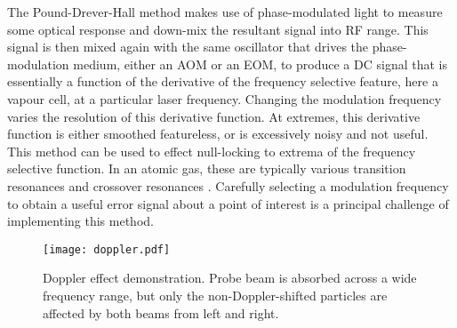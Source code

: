 The Pound-Drever-Hall method makes use of phase-modulated light to measure some
optical response and down-mix the resultant signal into RF range. This signal
is then mixed again with the same oscillator that drives the phase-modulation medium,
either an AOM or an EOM, to produce a DC signal that is essentially a function of
the derivative of the frequency selective feature, here a vapour cell, at a particular
laser frequency. Changing the modulation frequency varies the resolution of this
derivative function. At extremes, this derivative function is either smoothed featureless,
or is excessively noisy and not useful. \\

This method can be used to effect null-locking to extrema of the frequency selective
function. In an atomic gas, these are typically various transition resonances and
crossover resonances \cite{maguire2006}. Carefully selecting a modulation frequency
to obtain a useful error signal about a point of interest is a principal challenge of
implementing this method.

\begin{figure}[!hrt]
    \centering
    \label{fig:doppler}
    \texttt{[image: doppler.pdf]}
    \caption{Doppler effect demonstration.  Probe beam is absorbed across a wide frequency range, but only the non-Doppler-shifted particles are affected by both beams from left and right.}
\end{figure}
